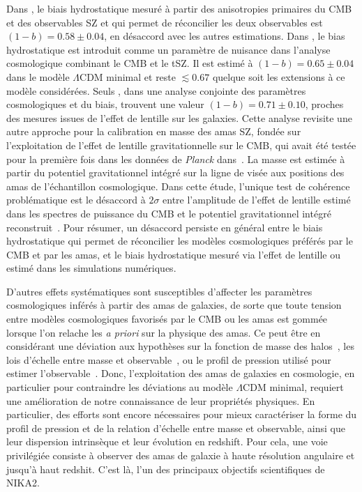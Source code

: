 Dans \citet{Planck_2016_SZ_cosmo}, le biais hydrostatique mesuré à partir
des anisotropies primaires du CMB et des observables SZ et qui permet
de réconcilier les deux observables est $(1-b) = 0.58 \pm 0.04$, en
désaccord avec les autres estimations. Dans \citet{Salvati2018}, le
bias hydrostatique est introduit comme un paramètre de nuisance dans
l'analyse cosmologique combinant le CMB et le tSZ. Il est estimé à
$(1-b) = 0.65 \pm 0.04$ dans le modèle $\Lambda$CDM minimal et reste
$\lesssim 0.67$ quelque soit les extensions à ce modèle considérées.
Seuls \citet{Zulbedia2019}, dans une analyse conjointe des paramètres
cosmologiques et du biais, trouvent une valeur
$(1-b) = 0.71 \pm 0.10$, proches des mesures issues de l'effet de
lentille sur les galaxies. Cette analyse revisite une autre approche
pour la calibration en masse des amas SZ, fondée sur l'exploitation de
l'effet de lentille gravitationnelle sur le CMB, qui avait été testée
pour la première fois dans les données de \emph{Planck}
dans~\citet{Melin2015, Planck_2016_SZ_cosmo}.
La masse est estimée à partir du potentiel gravitationnel intégré sur
la ligne de visée aux positions des amas de l'échantillon
cosmologique. Dans cette étude, l'unique test de cohérence
problématique est le désaccord à $2\sigma$ entre l'amplitude de
l'effet de lentille estimé dans les spectres de puissance du CMB et le
potentiel gravitationnel intégré
reconstruit~\citep{Planck_2018_cosmo}. Pour résumer, un désaccord
persiste en général entre le biais hydrostatique qui permet de
réconcilier les modèles cosmologiques préférés par le CMB et par les
amas, et le biais hydrostatique mesuré via l'effet de lentille ou
estimé dans les simulations numériques. 
 
D'autres effets systématiques sont susceptibles d'affecter les
paramètres cosmologiques inférés à partir des amas de galaxies, de
sorte que toute tension entre modèles
cosmologiques favorisés par le CMB ou les amas est gommée lorsque l'on
relache les \emph{a priori} sur la physique des amas. Ce peut être en
considérant une déviation aux hypothèses sur la fonction de masse des
halos~\citep{Bocquet2016}, les lois d'échelle entre masse et
observable~\citep{Planck_2016_SZ_cosmo}, ou le profil de pression
utilisé pour estimer l'observable~\citep{Ruppin2019b}. Donc,
l'exploitation des amas de galaxies en cosmologie, en particulier pour
contraindre les déviations au modèle $\Lambda$CDM minimal, requiert
une amélioration de notre connaissance de leur propriétés
physiques. En particulier, des efforts sont encore nécessaires pour
mieux caractériser la forme du profil de pression et de la relation
d'échelle entre masse et observable, ainsi que leur dispersion
intrinsèque et leur évolution en redshift.  
Pour cela, une voie privilégiée consiste à observer des amas de
galaxie à haute résolution angulaire et jusqu'à haut redshit. C'est
là, l'un des principaux objectifs scientifiques de NIKA2. 



